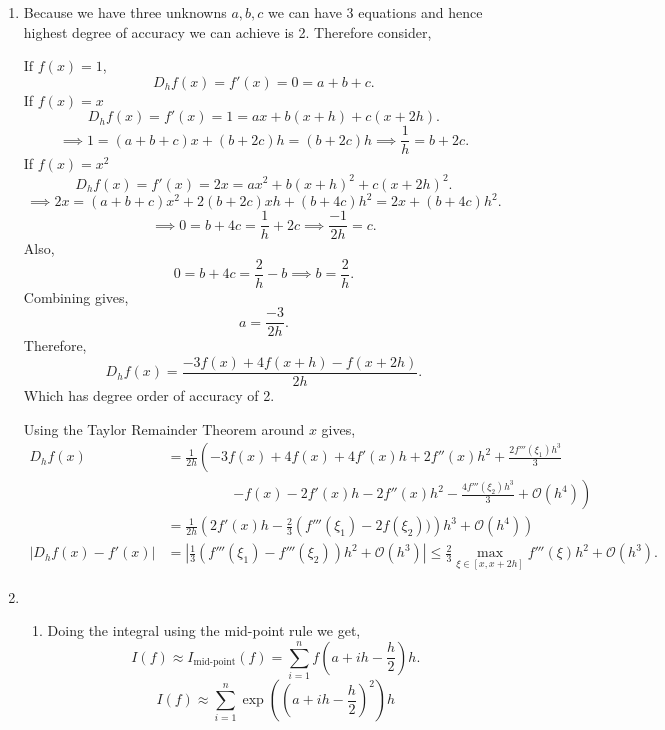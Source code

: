 \documentclass{report}
\begin{document}
\begin{solution}
	\begin{enumerate}[label=(\alph*)]
		\item Because we have three unknowns $a,b,c$ we can have 3 equations and hence highest degree of accuracy we can achieve is 2. Therefore consider,

		      $	\text{If } f(x)=1$,
		      \[
			      D_h f(x) = f'(x) = 0= a +b +c
			      .\]
		      If $f(x) = x$
		      \[
			      D_h f(x)= f'(x) = 1 = ax + b(x+h)+c(x+2h)
			      .\]
		      \[
			      \implies 1 = (a+b+c)x + (b+2c)h = (b+2c)h \implies \frac{1}{h} = b+2c
			      .\]
		      If $f(x) = x^2$
		      \[
			      D_h f(x) = f'(x) = 2x = ax^2 + b(x+h)^2+c(x+2h)^2
			      .\]
		      \[
			      \implies 2x = (a+b+c)x^2 + 2(b+2c)xh+ (b+4c)h^2 = 2x+(b+4c)h^2
			      .\]
		      \[
			      \implies 0 = b+4c = \frac{1}{h} + 2c \implies \frac{-1}{2h} = c
			      .\]
		      Also,
		      \[
			      0 = b+4c = \frac{2}{h} - b \implies b = \frac{2}{h}
			      .\]
		      Combining gives,
		      \[
			      a = \frac{-3}{2h}
			      .\]
		      Therefore,
		      \[
			      D_h f(x) = \frac{-3f(x) + 4f(x+h) -f(x+2h)}{2h}
			      .\]
		      Which has degree order of accuracy of 2.

		      Using the Taylor Remainder Theorem around $x$ gives,
		      \begin{align*}
			      D_{h}f(x)                       & =
			      \frac{1}{2h} \left( -3f(x) + 4f(x) + 4 f'(x) h + 2f''(x)h^2 + \frac{2f'''(\xi_1)h^3}{3} \right. \\
			                                      & \hspace{2cm} \left. - f\left( x \right) - 2f'(x)h - 2f''(x) h^2  -   \frac{4f'''(\xi_2)h^3}{3} +  \mathcal{O}(h^4) \right) \\
			                                      & = \frac{1}{2h} \left(2f'(x)h-\frac{2}{3} \left( f'''(\xi_1) - 2f(\xi_2)) \right) h^3 + \mathcal{O}(h^{4}) \right) \\
			      |D_{h}f\left(x \right) - f'(x)| & = \left|\frac{1}{3} (f'''(\xi_1) - f'''(\xi_2))h^2 + \mathcal{O}(h^{3})\right|\le \frac{2}{3} \underset{\xi\in[x,x+2h]}{\operatorname{max}} f'''\left( \xi \right) h^2 + \mathcal{O}(h^3)
			      .\end{align*}
		\item
		      \begin{enumerate}[label=(\roman*)]
			      \item Doing the integral using the mid-point rule we get,
			            \[
				            I(f) \approx I_\text{mid-point}(f) = \sum_{i=1}^{n} f\left(a+ih-\frac{h}{2}\right) h
				            .\]
			            \[
				            I(f) \approx \sum_{i=1}^{n} \exp\left(\left(a+ih-\frac{h}{2}\right)^{2}\right) h
			            \]


\end{enumerate}
\end{enumerate}
\end{solution}
\end{document}
